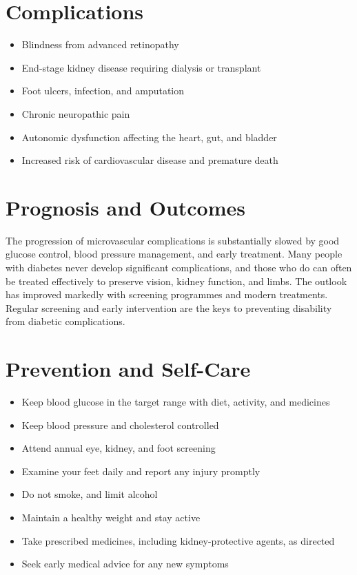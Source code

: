 \section*{Complications}
\begin{itemize}
    \item Blindness from advanced retinopathy
    \item End-stage kidney disease requiring dialysis or transplant
    \item Foot ulcers, infection, and amputation
    \item Chronic neuropathic pain
    \item Autonomic dysfunction affecting the heart, gut, and bladder
    \item Increased risk of cardiovascular disease and premature death
\end{itemize}

\section*{Prognosis and Outcomes}
The progression of microvascular complications is substantially slowed by good glucose control, blood pressure management, and early treatment. Many people with diabetes never develop significant complications, and those who do can often be treated effectively to preserve vision, kidney function, and limbs. The outlook has improved markedly with screening programmes and modern treatments. Regular screening and early intervention are the keys to preventing disability from diabetic complications.

\section*{Prevention and Self-Care}
\begin{itemize}
    \item Keep blood glucose in the target range with diet, activity, and medicines
    \item Keep blood pressure and cholesterol controlled
    \item Attend annual eye, kidney, and foot screening
    \item Examine your feet daily and report any injury promptly
    \item Do not smoke, and limit alcohol
    \item Maintain a healthy weight and stay active
    \item Take prescribed medicines, including kidney-protective agents, as directed
    \item Seek early medical advice for any new symptoms
\end{itemize}

